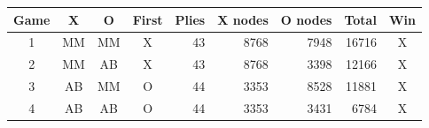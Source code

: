 \begin{tabular}{ccccrrrrc}
\toprule
Game & X & O & First & Plies & X nodes & O nodes & Total & Win \\
\midrule
1 & MM & MM & X & 43 & 8768 & 7948 & 16716 & X \\
2 & MM & AB & X & 43 & 8768 & 3398 & 12166 & X \\
3 & AB & MM & O & 44 & 3353 & 8528 & 11881 & X \\
4 & AB & AB & O & 44 & 3353 & 3431 & 6784 & X \\
\bottomrule
\end{tabular}
